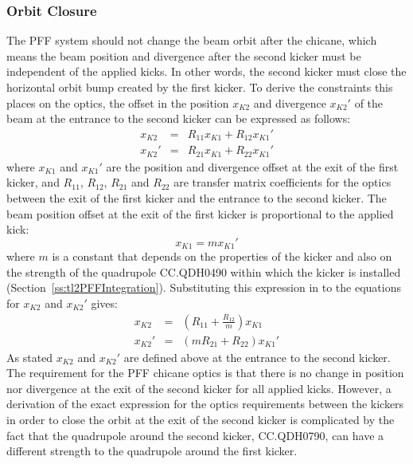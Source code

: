 \subsubsection{Orbit Closure}

The PFF system should not change the beam orbit after the chicane, which means the beam position and divergence after the second kicker must be independent of the applied kicks. In other words, the second kicker must close the horizontal orbit bump created by the first kicker. 
To derive the constraints this places on the optics, the offset in the position \(x_{K2}\) and divergence \(x_{K2}'\) of the beam at the entrance to the second kicker can be expressed as follows:
\begin{eqnarray}
x_{K2} &=& R_{11}x_{K1} + R_{12}x_{K1}' \\
x_{K2}' &=& R_{21}x_{K1} + R_{22}x_{K1}'
\end{eqnarray}
where \(x_{K1}\) and \(x_{K1}'\) are the position and divergence offset at the exit of the first kicker, and \(R_{11}\), \(R_{12}\), \(R_{21}\) and \(R_{22}\) are transfer matrix coefficients for the optics between the exit of the first kicker and the entrance to the second kicker. The beam position offset at the exit of the first kicker is proportional to the applied kick:
\begin{equation}
x_{K1} = m x_{K1}'
\end{equation}
where \(m\) is a constant that depends on the properties of the kicker and also on the strength of the quadrupole CC.QDH0490 within which the kicker is installed (Section~\ref{ss:tl2PFFIntegration}). Substituting this expression in to the equations for \(x_{K2}\) and \(x_{K2}'\) gives:
\begin{eqnarray}
x_{K2} &=& \left(R_{11} + \frac{R_{12}}{m}\right)x_{K1} \\
x_{K2}' &=& (m R_{21} + R_{22})x_{K1}'
\end{eqnarray}
As stated \(x_{K2}\) and \(x_{K2}'\) are defined above at the entrance to the second kicker. The requirement for the PFF chicane optics is that there is no change in position nor divergence at the exit of the second kicker for all applied kicks. However, a derivation of the exact expression for the optics requirements between the kickers in order to close the orbit at the exit of the second kicker is complicated by the fact that the quadrupole around the second kicker, CC.QDH0790, can have a different strength to the quadrupole around the first kicker. 

